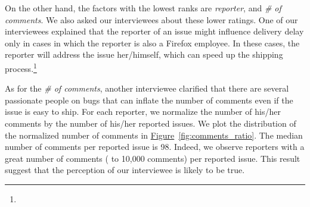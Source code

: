 \begin{sloppypar}
On the other hand, the factors with the lowest ranks are {\em reporter}, and
{\em \# of comments}. We also asked our interviewees about these lower ratings.
One of our interviewees explained that the reporter of an issue might influence
delivery delay only in cases in which the reporter is also a Firefox employee.
In these cases, the reporter will address the issue her/himself, which can speed
up the shipping process.\DIFdelbegin \footnote{} %
\addtocounter{footnote}{-1}%
\DIFdelend \DIFaddbegin {} \DIFaddend As for the {\em \# of comments}, another interviewee
clarified that there are several passionate people on bugs that can inflate the
number of comments even if the issue is easy to ship. For each reporter, we
normalize the number of his/her comments by the number of his/her reported
issues.  We plot the distribution of the normalized number of comments in
\hyperref[fig:comments_ratio]{Figure}~\ref{fig:comments_ratio}. The median
number of comments per reported issue is 98. Indeed, we observe reporters with a
great number of comments ( to 10,000 comments) per reported issue.  This
result suggest that the perception of our interviewee is likely to be true.


\end{sloppypar}
